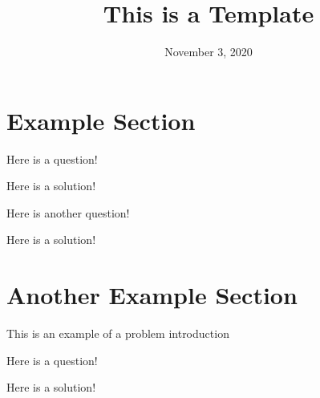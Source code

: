 \documentclass[11pt]{exam}
\title{This is a Template}
\date{November 3, 2020}
\begin{document}
\maketitle

\section{Example Section}

\begin{questions}
\question Here is a question!

\begin{solution}[0.5in]
Here is a solution!
\end{solution}

\question Here is another question!

\begin{solution}[0.5in]
Here is a solution!
\end{solution}

\end{questions}

\newpage
\section{Another Example Section}
This is an example of a problem introduction
\begin{questions}
\question Here is a question!

\begin{solution}[0.5in]
Here is a solution!
\end{solution}
\end{questions}
\end{document}
